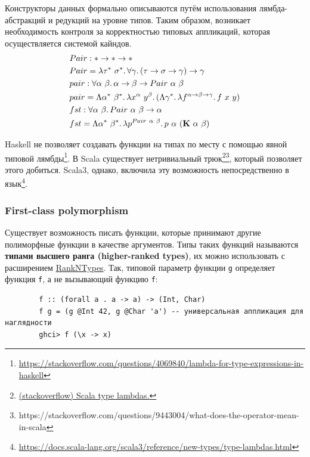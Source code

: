 \documentclass[12pt]{article}
\newcommand{\vocab}[1]{\textbf{#1}} %
\newcommand{\ap}{~}
\begin{document}
    Конструкторы данных формально описываются путём использования лямбда-абстракций и редукций на уровне типов.
    Таким образом, возникает необходимость контроля за корректностью типовых аппликаций, которая осуществляется системой кайндов.
    \begin{align*}
        &Pair : * \rightarrow * \rightarrow * \\
        &Pair = \lambda \tau^*~\sigma^*\ldotp\forall \gamma\ldotp(\tau\rightarrow\sigma\rightarrow\gamma)\to\gamma \\
        &pair : \forall \alpha~\beta\ldotp\alpha \rightarrow \beta \rightarrow Pair~\alpha~\beta \\
        &pair = \Lambda \alpha^*~\beta^*\ldotp\lambda x^\alpha~y^\beta\ldotp(\Lambda \gamma^*\ldotp\lambda f^{\alpha\rightarrow\beta\rightarrow\gamma}\ldotp f~x~y) \\
        &fst : \forall \alpha~\beta\ldotp Pair~\alpha~\beta\rightarrow \alpha \\
        &fst = \Lambda \alpha^*~\beta^*\ldotp\lambda p^{Pair~\alpha~\beta}\ldotp p~\alpha~(\mathbf{K}\ap\alpha\ap\beta)
    \end{align*}

    Haskell не позволяет создавать функции на типах по месту с помощью явной типовой лямбды\footnote{\url{https://stackoverflow.com/questions/4069840/lambda-for-type-expressions-in-haskell}}.
    В Scala существует нетривиальный трюк\footnote{\href{https://stackoverflow.com/questions/8736164/what-are-type-lambdas-in-scala-and-what-are-their-benefits}{(stackoverflow) Scala type lambdas.}}\footnote{https://stackoverflow.com/questions/9443004/what-does-the-operator-mean-in-scala}, который позволяет этого добиться.
    Scala3, однако, включила эту возможность непосредственно в язык\footnote{\url{https://docs.scala-lang.org/scala3/reference/new-types/type-lambdas.html}}.

    \subsubsection{First-class polymorphism}

    Существует возможность писать функции, которые принимают другие полиморфные функции в качестве аргументов.
    Типы таких функций называются \vocab{типами высшего ранга (higher-ranked types)}, их можно использовать с расширением \href{https://downloads.haskell.org/ghc/latest/docs/users_guide/exts/rank_polymorphism.html}{RankNTypes}.
    Так, типовой параметр функции \texttt{g} определяет функция \texttt{f}, а не вызывающий функцию \texttt{f}:
    \begin{verbatim}
        f :: (forall a . a -> a) -> (Int, Char)
        f g = (g @Int 42, g @Char 'a') -- универсальная аппликация для наглядности
        ghci> f (\x -> x)
    \end{verbatim}
\end{document}
